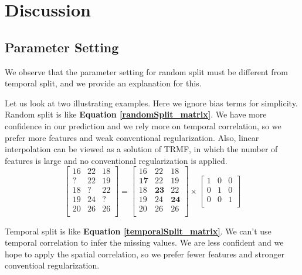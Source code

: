 \section{Discussion}  \label{sec:disc}

\subsection{Parameter Setting} \label{subsec:parameter}

We observe that the parameter setting for random split must be different from temporal split, and we provide an explanation for this. 

Let us look at two illustrating examples. Here we ignore bias terms for simplicity. Random split is like \textbf{Equation \ref{randomSplit_matrix}}. We have more confidence in our prediction and we rely more on temporal correlation, so we prefer more features and weak conventional regularization. Also, linear interpolation can be viewed as a solution of TRMF, in which the number of features is large and no conventional regularization is applied. 
\begin{equation}
\label{randomSplit_matrix}
\begin{bmatrix}
16 & 22 & 18\\
 ? & 22 & 19\\
18 &  ?	& 22\\
19 & 24 &  ?\\
20 & 26 & 26\\
\end{bmatrix} 
= 
\begin{bmatrix}
16 & 22 & 18\\
\mathbf{17} & 22 & 19\\
18 & \mathbf{23}	& 22\\
19 & 24 & \mathbf{24}\\
20 & 26 & 26\\
\end{bmatrix} 
\times
\begin{bmatrix}
1 & 0 & 0\\
0 & 1 & 0\\
0 & 0 & 1\\
\end{bmatrix} 
\end{equation}

Temporal split is like \textbf{Equation \ref{temporalSplit_matrix}}. We can't use temporal correlation to infer the missing values. We are less confident and we hope to apply the spatial correlation, so we prefer fewer features and stronger conventioal regularization.

